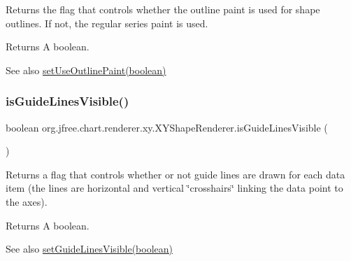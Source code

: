 Returns the flag that controls whether the outline paint is used for shape outlines. If not, the regular series paint is used.

\begin{DoxyReturn}{Returns}
A boolean.
\end{DoxyReturn}
\begin{DoxySeeAlso}{See also}
\mbox{\hyperlink{classorg_1_1jfree_1_1chart_1_1renderer_1_1xy_1_1_x_y_shape_renderer_adbe35144935f7f1a672617d4b5564db9}{set\+Use\+Outline\+Paint(boolean)}} 
\end{DoxySeeAlso}
\mbox{\label{classorg_1_1jfree_1_1chart_1_1renderer_1_1xy_1_1_x_y_shape_renderer_a34e6023b51701e33b663b29b910c22d7}} 
\subsubsection{\texorpdfstring{is\+Guide\+Lines\+Visible()}{isGuideLinesVisible()}}
{\footnotesize\ttfamily boolean org.\+jfree.\+chart.\+renderer.\+xy.\+X\+Y\+Shape\+Renderer.\+is\+Guide\+Lines\+Visible (\begin{DoxyParamCaption}{ }\end{DoxyParamCaption})}

Returns a flag that controls whether or not guide lines are drawn for each data item (the lines are horizontal and vertical \char`\"{}crosshairs\char`\"{} linking the data point to the axes).

\begin{DoxyReturn}{Returns}
A boolean.
\end{DoxyReturn}
\begin{DoxySeeAlso}{See also}
\mbox{\hyperlink{classorg_1_1jfree_1_1chart_1_1renderer_1_1xy_1_1_x_y_shape_renderer_acc952376b7b01c311a047bbd6ecde93a}{set\+Guide\+Lines\+Visible(boolean)}} 
\end{DoxySeeAlso}
\mbox{\label{classorg_1_1jfree_1_1chart_1_1renderer_1_1xy_1_1_x_y_shape_renderer_aa544ccd4f173a8bab5765f35efcc10b4}} 
